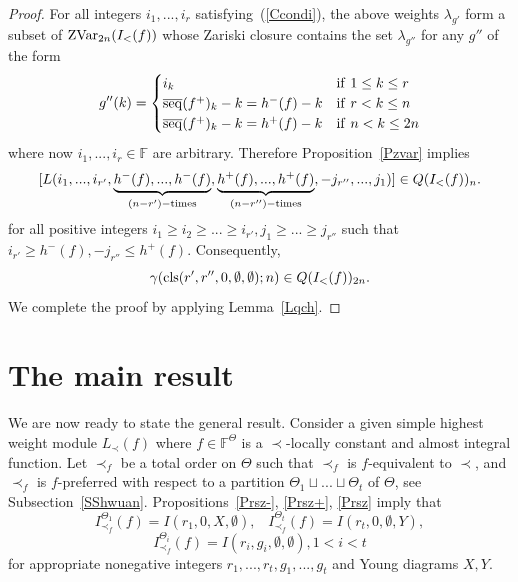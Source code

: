 \documentclass[10pt]{amsart}\oddsidemargin -1mm \evensidemargin -1mm \topmargin -15mm\headheight5mm \headsep 3.5mm \textheight 245mm\textwidth 170mm
\theoremstyle{definition}\newtheorem{theorem}{Theorem}[section]\newtheorem{lemma}[theorem]{Lemma}\newtheorem{remark}[theorem]{Remark}\newtheorem{proposition}[theorem]{Proposition}\newtheorem{corollary}[theorem]{Corollary}\newtheorem{definition}[theorem]{Definition}\newtheorem{Ex}[theorem]{Example}\newtheorem{obs}[theorem]{Observation}\newtheorem{nota}[theorem]{Notation}
\begin{document}
\begin{proof}
For all integers $i_1,..., i_r$ satisfying~(\ref{Ccondi}), the above weights $\lambda_{g'}$ form a subset of ${\rm ZVar}_{2n}(I_<(f))$ whose Zariski closure contains the set $\lambda_{g''}$ for any $g''$ of the form
$$g''(k)=\begin{cases} i_k&{\rm if~}1\le k\le r\\
{\rm\overline{seq}}(f^+)_k-k=h^-(f)-k&{\rm if~}r<k\le n\\
{\rm\overline{seq}}(f^+)_k-k=h^+(f)-k&{\rm if~}n<k\le 2n\\
\end{cases}$$
where now $i_1,..., i_r\in\mathbb F$ are arbitrary. 
Therefore Proposition~\ref{Pzvar} implies
$$[L(i_1,..., i_{r'}, \underbrace{h^-(f),..., h^-(f)}_{(n-r')-{\rm times}}, \underbrace{h^+(f),..., h^+(f)}_{(n-r'')-{\rm times}}, -j_{r''},..., j_{1})]\in Q(I_<(f))_n.$$
for all positive integers $i_1\ge i_2\ge...\ge i_{r'}, j_1\ge...\ge j_{r''}$ such that $i_{r'}\ge h^-(f), -j_{r''}\le h^+(f)$. Consequently, $$\gamma({\rm cls}(r', r'', 0, \emptyset, \emptyset); n)\in Q(I_<(f))_{2n}.$$
We complete the proof by applying Lemma~\ref{Lqch}.\end{proof}

\section{The main result}\label{Smain}
We are now ready to state the general result. 
Consider a given simple highest weight module $L_\prec(f)$ where $f\in\mathbb F^\Theta$ is a $\prec$-locally constant and almost integral function. 
Let $\prec_f$ be a total order on $\Theta$ such that $\prec_f$ is $f$-equivalent to $\prec$, and $\prec_f$ is $f$-preferred with respect to a partition $\Theta_1\sqcup...\sqcup\Theta_t$ of $\Theta$, see Subsection~\ref{SShwuan}. 
Propositions~\ref{Prsz-}, \ref{Prsz+}, \ref{Prsz} imply that
$$I_{\prec_f}^{\Theta_1}(f)=I(r_1, 0, {X}, \emptyset),\hspace{10pt} I_{\prec_f}^{\Theta_t}(f)=I(r_t, 0, \emptyset, {Y}),$$
$$I_{\prec_f}^{\Theta_i}(f)=I(r_i, g_i, \emptyset, \emptyset), 1<i<t$$
for appropriate nonegative integers $r_1,..., r_t, g_1,..., g_t$ and Young diagrams $X, Y$.



\end{document}
